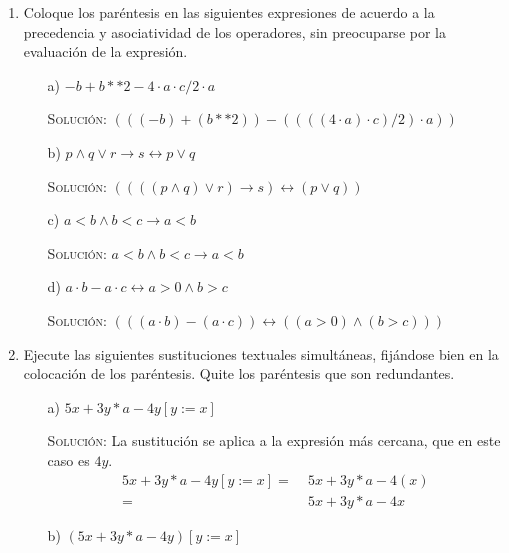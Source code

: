 \documentclass[letterpaper,11pt]{article}
\begin{document}
\begin{enumerate}
    \item Coloque los paréntesis en las siguientes expresiones de acuerdo a la 
    precedencia y asociatividad de los operadores, sin preocuparse por la
    evaluación de la expresión.

    \begin{itemize}
        \item[a)] $-b + b * * 2 - 4 \cdot a \cdot c / 2 \cdot a$ 
        
        \textsc{Solución:} 
        $(((-b) + (b * * 2)) - ((((4 \cdot a) \cdot c) / 2) \cdot a))$ 

        \item[b)] $p \land q \lor r → s ↔ p \lor q$

        \textsc{Solución:} $((((p \land q) \lor r) → s) ↔ (p \lor q))$

        \item[c)] $a < b \land b < c → a < b$

        \textsc{Solución:} $a < b \land b < c → a < b$

        \item[d)] $a \cdot b -a \cdot c ↔ a > 0 \land b > c$
        
        \textsc{Solución:} 
        $(((a \cdot b) - (a \cdot c)) ↔ ((a > 0) \land (b > c)))$
    \end{itemize}

    \item Ejecute las siguientes sustituciones textuales simultáneas, fijándose
    bien en la colocación de los paréntesis. Quite los paréntesis que son 
    redundantes.

    \begin{itemize}
        \item[a)] $5x + 3y * a - 4y[y := x]$ 

        \textsc{Solución:} La sustitución se aplica a la expresión más cercana,
        que en este caso es $4y$.
        \begin{align*} 
            5x + 3y * a - 4y[y := x]
            =& \; 5x + 3y * a - 4(x) \\
            =& \; 5x + 3y * a - 4x
        \end{align*}

        \item[b)] $(5x + 3y * a - 4y)[y := x]$


\end{itemize}
\end{enumerate}
\end{document}
